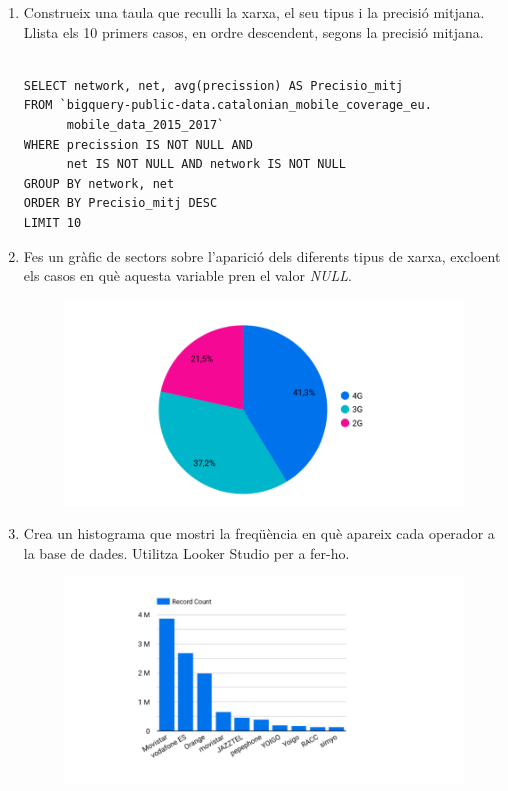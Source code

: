 \documentclass[12pt,longbibliography]{article}
\theoremstyle{definition}
\theoremstyle{remark}
\begin{document}
\begin{enumerate}
\item Construeix una taula que reculli la xarxa, el seu tipus i la precisió mitjana. Llista els 10 primers casos, en ordre descendent, segons la precisió mitjana.

\begin{Verbatim}[frame=single]

SELECT network, net, avg(precission) AS Precisio_mitj
FROM `bigquery-public-data.catalonian_mobile_coverage_eu.
      mobile_data_2015_2017`
WHERE precission IS NOT NULL AND 
      net IS NOT NULL AND network IS NOT NULL
GROUP BY network, net
ORDER BY Precisio_mitj DESC
LIMIT 10
\end{Verbatim}

\item Fes un gràfic de sectors sobre l'aparició dels diferents tipus de xarxa, excloent els casos en què aquesta variable pren el valor \textit{NULL}.

\vspace{2mm}
\begin{figure}[H]
\begin{center}
\includegraphics[width=12.5cm]{pbq1}
\end{center}
\label{fig:pbq1}
\end{figure}

\item Crea un histograma que mostri la freqüència en què apareix cada operador a la base de dades. Utilitza Looker Studio per a fer-ho.

\vspace{2mm}
\begin{figure}[H]
\begin{center}
\includegraphics[width=12.5cm]{pbq2}
\end{center}
\label{fig:pbq2}
\end{figure}

\end{enumerate}
\end{document}
